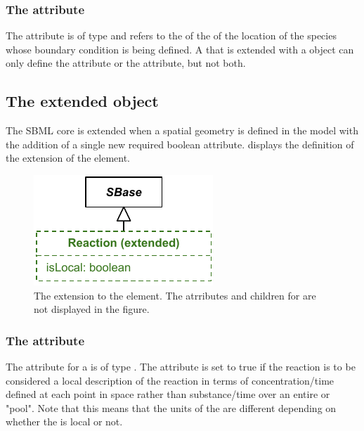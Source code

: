 \subsubsection{The  attribute}
The  attribute is of type  and refers to the  of the \DomainType of the location of the species whose boundary condition is being defined. A \Parameter that is extended with a \BoundaryCondition object can only define the  attribute or the  attribute, but not both. 


\subsection{The extended \Reaction object}
\label{extended-reaction-class}
The SBML core \Reaction is extended when a spatial geometry is defined in the model with the addition of a single new required boolean  attribute.  displays the definition of the extension of the \Reaction element.
 
\begin{figure}[ht]
  \includegraphics{figs/extended-reaction-uml}
  \caption{The extension to the \Reaction element. The \sbmlthreecore atrributes and children for \Reaction are not displayed in the figure.}
  \label{reaction-uml}
\end{figure}

\subsubsection{The  attribute}
The  attribute for a \Reaction is of type . The attribute is set to true if the reaction is to be considered a local description of the reaction in terms of concentration/time defined at each point in space rather than substance/time over an entire \Compartment or "pool".  Note that this means that the units of the \KineticLaw are different depending on whether the \Reaction is local or not.


